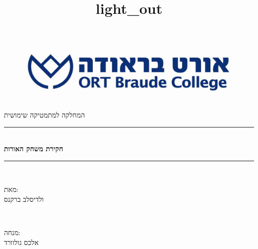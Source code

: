 \documentclass[12pt,leqno]{article}
\title{light\_out}
\theoremstyle{theoremdd}
\begin{document}
\begin{titlepage}
\newcommand{\HRule}{\rule{\linewidth}{0.5mm}} %

\center %
\begin{figure}[ht]
	\begin{center}
		{\includegraphics[scale=0.5]{images/Braude_Logo.jpg}}
	\end{center}
\end{figure}

{\LARGE 
המחלקה למתמטיקה שימושית
}
\vspace{20pt}


\HRule \\[0.4cm]
{ \huge \bfseries
חקירת משחק האורות
 } \\[0.4cm] 
\HRule \\[1.5cm]

\hspace{50pt}  
\begin{minipage}{0.4\textwidth}
    \begin{flushright} \large
    מאת:
    \\
    ולדיסלב ברקנס
    \end{flushright}
\end{minipage}
    ~
\begin{minipage}{0.4\textwidth}
    \begin{flushright} \large
    מנחה:
    \\
    אלכס גולוורד 
    \end{flushright}
\end{minipage}\\[2cm]


\end{titlepage}
\end{document}
